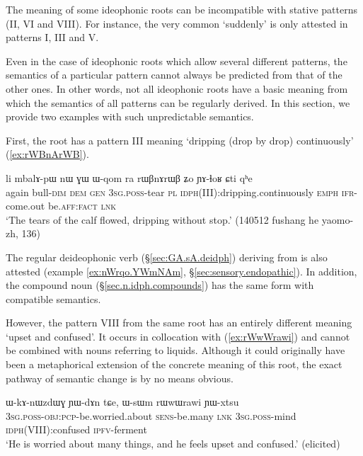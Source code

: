 The meaning of some ideophonic roots can be incompatible with stative patterns (II, VI and VIII). For instance, the very common   `suddenly' is only attested in patterns I, III and V. 

Even in the case of ideophonic roots which allow several different patterns, the semantics of a particular pattern cannot always be predicted from that of the other ones. In other words, not all ideophonic roots have a basic meaning from which the semantics of all patterns can be regularly derived. In this section, we provide two examples with such unpredictable semantics.

First, the root    has a pattern III  meaning `dripping (drop by drop) continuously' (\ref{ex:rWBnArWB}).
  
\begin{exe} 
\ex  \label{ex:rWBnArWB}
\gll li mbalɤ-pɯ nɯ ɣɯ ɯ-qom ra rɯβnɤrɯβ ʑo ɲɤ-ɬoʁ ɕti qʰe \\
again bull-\textsc{dim} \textsc{dem} \textsc{gen} \textsc{3sg}.\textsc{poss}-tear \textsc{pl} \textsc{idph}(III):dripping.continuously  \textsc{emph} \textsc{ifr}-come.out be.\textsc{aff}:\textsc{fact} \textsc{lnk} \\
\glt `The tears of the calf flowed, dripping without stop.' (140512 fushang he yaomo-zh, 136)
 \end{exe}

The regular  deideophonic verb (§\ref{sec:GA.sA.deidph})   deriving from  is also attested (example \ref{ex:nWrqo.YWmNAm}, §\ref{sec:sensory.endopathic}). In addition, the compound noun  (§\ref{sec.n.idph.compounds}) has the same form with compatible semantics.

However, the pattern VIII  from the same root has an entirely different meaning  `upset and confused'. It occurs in collocation with  (\ref{ex:rWwWrawi}) and cannot be combined with nouns referring to liquids.  Although it could originally have been a metaphorical extension of the concrete meaning of this root, the exact pathway of semantic change is by no means obvious.
 
 \begin{exe} 
\ex  \label{ex:rWwWrawi}
\gll  ɯ-kɤ-nɯzdɯɣ ɲɯ-dɤn tɕe, ɯ-sɯm rɯwɯrawi ɲɯ-xtsu  \\
\textsc{3sg}.\textsc{poss}-\textsc{obj}:\textsc{pcp}-be.worried.about \textsc{sens}-be.many \textsc{lnk} \textsc{3sg}.\textsc{poss}-mind \textsc{idph}(VIII):confused \textsc{ipfv}-ferment   \\
\glt `He is worried about many things, and he feels upset and confused.' (elicited)
 \end{exe}
 
